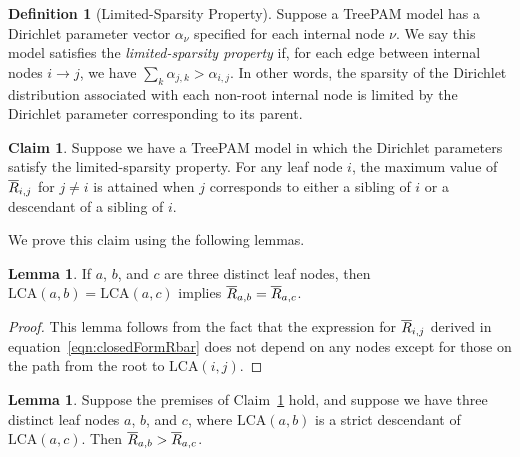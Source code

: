 \documentclass{article}
\theoremstyle{definition}
\newtheorem{lemma}[thm]{Lemma}
\newtheorem{claim}[thm]{Claim}
\newtheorem{defn}[thm]{Definition}
\begin{document}
\begin{defn}[Limited-Sparsity Property]
Suppose a TreePAM model has a Dirichlet parameter vector $\alpha_\nu$ specified for each internal node $\nu$.
We say this model satisfies the \emph{limited-sparsity property} if, for each edge between internal nodes $i \to j$, we have $\sum_k \alpha_{j,k} > \alpha_{i,j}$.
In other words, the sparsity of the Dirichlet distribution associated with each non-root internal node is limited by the Dirichlet parameter corresponding to its parent.
\end{defn}

\begin{claim}
Suppose we have a TreePAM model in which the Dirichlet parameters satisfy the limited-sparsity property.
For any leaf node $i$, the maximum value of $\overline{R}_{i,j}$ for $j \neq i$ is attained when $j$ corresponds to either a sibling of $i$ or a descendant of a sibling of $i$.
\label{claim:RbarMatrixProperty}
\end{claim}

We prove this claim using the following lemmas.

\begin{lemma}
If $a$, $b$, and $c$ are three distinct leaf nodes, then $\text{LCA}(a,b) = \text{LCA}(a,c)$ implies $\overline{R}_{a,b} = \overline{R}_{a,c}$.
\label{lemma:equalLCA}
\end{lemma}

\begin{proof}
This lemma follows from the fact that the expression for $\overline{R}_{i,j}$ derived in equation~\eqref{eqn:closedFormRbar} does not depend on any nodes except for those on the path from the root to $\text{LCA}(i,j)$.
\end{proof}

\begin{lemma}
Suppose the premises of Claim~\ref{claim:RbarMatrixProperty} hold, and suppose we have three distinct leaf nodes $a$, $b$, and $c$, where $\text{LCA}(a,b)$ is a strict descendant of $\text{LCA}(a,c)$.
Then $\overline{R}_{a,b} > \overline{R}_{a,c}$.
\label{lemma:greaterLCA}
\end{lemma}
\end{document}
